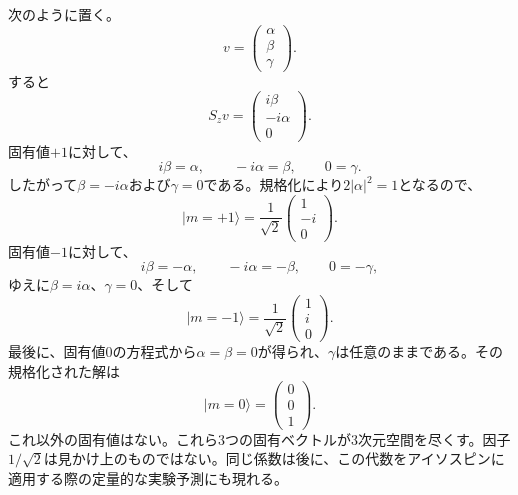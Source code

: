 次のように置く。
\begin{equation}
v=
\begin{pmatrix}
\alpha\\
\beta\\
\gamma
\end{pmatrix}.
\end{equation}
すると
\begin{equation}
S_zv
=
\begin{pmatrix}
i\beta\\
-i\alpha\\
0
\end{pmatrix}.
\end{equation}
固有値\(+1\)に対して、
\begin{equation}
i\beta=\alpha,
\qquad
-i\alpha=\beta,
\qquad
0=\gamma.
\end{equation}
したがって\(\beta=-i\alpha\)および\(\gamma=0\)である。規格化により\(2|\alpha|^2=1\)となるので、
\begin{equation}
|m=+1\rangle
=
\frac{1}{\sqrt2}
\begin{pmatrix}
1\\
-i\\
0
\end{pmatrix}.
\end{equation}
固有値\(-1\)に対して、
\begin{equation}
i\beta=-\alpha,
\qquad
-i\alpha=-\beta,
\qquad
0=-\gamma,
\end{equation}
ゆえに\(\beta=i\alpha\)、\(\gamma=0\)、そして
\begin{equation}
|m=-1\rangle
=
\frac{1}{\sqrt2}
\begin{pmatrix}
1\\
i\\
0
\end{pmatrix}.
\end{equation}
最後に、固有値0の方程式から\(\alpha=\beta=0\)が得られ、\(\gamma\)は任意のままである。その規格化された解は
\begin{equation}
|m=0\rangle
=
\begin{pmatrix}
0\\
0\\
1
\end{pmatrix}.
\end{equation}
これ以外の固有値はない。これら3つの固有ベクトルが3次元空間を尽くす。因子\(1/\sqrt2\)は見かけ上のものではない。同じ係数は後に、この代数をアイソスピンに適用する際の定量的な実験予測にも現れる。

\begin{classroomqa}
\end{classroomqa}

